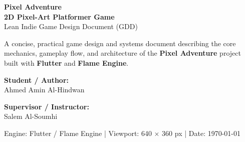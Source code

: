 \documentclass[11pt,a4paper]{article}
\begin{document}
\begin{titlepage}
    \centering
    \vspace*{2cm}
    
    {\LARGE \bfseries \color{primary} Pixel Adventure}\\[0.3cm]
    {\large \bfseries \color{accent} 2D Pixel-Art Platformer Game}\\[0.6cm]
    {\normalsize Lean Indie Game Design Document (GDD)}\\[2.5cm]
    
    \begin{minipage}{0.8\textwidth}
        \centering \small \color{darkgray}
        A concise, practical game design and systems document describing the core mechanics, gameplay flow, and architecture of the \textbf{Pixel Adventure} project built with \textbf{Flutter} and \textbf{Flame Engine}.
    \end{minipage}
    
    \vfill
    
    \begin{minipage}{0.45\textwidth}
        \begin{flushleft}
            \textbf{\color{primary} Student / Author:}\\
            Ahmed Amin Al-Hindwan
        \end{flushleft}
    \end{minipage}
    \hfill
    \begin{minipage}{0.45\textwidth}
        \begin{flushright}
            \textbf{\color{primary} Supervisor / Instructor:}\\
            Salem Al-Soumhi
        \end{flushright}
    \end{minipage}
    
    \vspace{2cm}
    {\footnotesize Engine: Flutter / Flame Engine \quad | \quad Viewport: 640 $\times$ 360 px \quad | \quad Date: \today}
    \vspace*{1cm}
\end{titlepage}

\tableofcontents
\newpage

\end{document}
